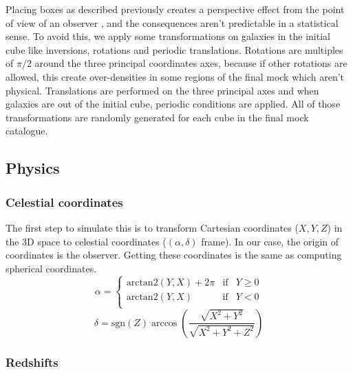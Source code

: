 Placing boxes as described previously creates a perspective effect from the
point of view of an observer \citep{Blaizot+05}, and the consequences aren't
predictable in a statistical sense. To avoid this, we apply some
transformations on galaxies in the initial cube like inversions, rotations and
periodic translations. Rotations are multiples of $\pi/2$ around the three
principal coordinates axes, because if other rotations are allowed, this create
over-densities in some regions of the final mock which aren't physical.
Translations are performed on the three principal axes and when galaxies are
out of the initial cube, periodic conditions are applied. All of those
transformations are randomly generated for each cube in the final mock
catalogue.

\subsection{Physics}

\subsubsection{Celestial coordinates}

The first step to simulate this is to transform Cartesian coordinates ($X, Y,
Z$) in the 3D space to celestial coordinates ($(\alpha,\delta)$ frame). In our
case, the origin of coordinates is the observer. Getting these coordinates is
the same as computing spherical coordinates.
%
\begin{equation}
    \alpha=\left\{ \begin{array}{lcr}
     \mbox{arctan2} \left(Y, X\right)+2\pi & \mbox{if} & Y\geqslant0 \\
     \mbox{arctan2} \left(Y, X\right) & \mbox{if} & Y<0\\
    \end{array}\right.\nonumber%
\end{equation}
%
\begin{equation}
    \delta=\mbox{sgn} \left(Z\right)
    \arccos\left(\frac{\sqrt{X^2+Y^2}}{\sqrt{X^2+Y^2+Z^2}}\right)
\end{equation}

\subsubsection{Redshifts}

